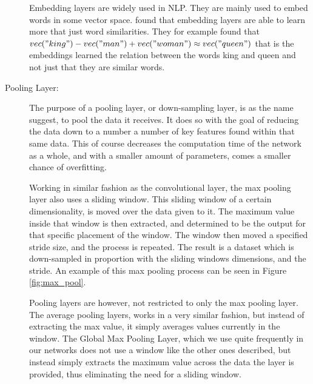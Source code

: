 \begin{description}
        Embedding layers are widely used in \gls{NLP}. They are mainly used
        to embed words in some vector space. \citet{mikolov2013linguistic}
        found that embedding layers are able to learn more that just word
        similarities. They for example found that $vec("king") - vec("man") +
        vec("woman") \approx vec("queen")$ that is the embeddings learned the
        relation between the words king and queen and not just that they are
        similar words.

    \item[Pooling Layer:]

        The purpose of a pooling layer, or down-sampling layer, is as the name
        suggest, to pool the data it receives. It does so with the goal of
        reducing the data down to a number a number of key features found within
        that same data. This of course decreases the computation time of the
        network as a whole, and with a smaller amount of parameters, comes a
        smaller chance of overfitting.

        Working in similar fashion as the convolutional layer, the max pooling
        layer also uses a sliding window. This sliding window of a certain
        dimensionality, is moved over the data given to it. The maximum value
        inside that window is then extracted, and determined to be the output
        for that specific placement of the window. The window then moved a
        specified stride size, and the process is repeated. The result is a
        dataset which is down-sampled in proportion with the sliding windows
        dimensions, and the stride. An example of this max pooling process can
        be seen in Figure \ref{fig:max_pool}.

        Pooling layers are however, not restricted to only the max pooling
        layer. The average pooling layers, works in a very similar fashion,
        but instead of extracting the max value, it simply averages values
        currently in the window. The Global Max Pooling Layer, which we use
        quite frequently in our networks does not use a window like the other
        ones described, but instead simply extracts the maximum value across
        the data the layer is provided, thus eliminating the need for a sliding
        window.


\end{description}
